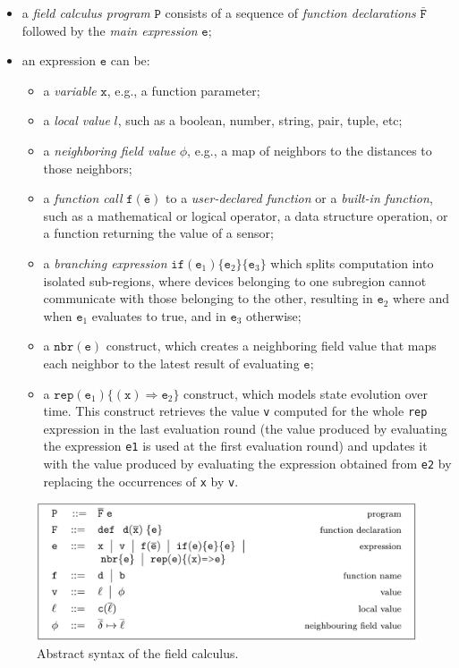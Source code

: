 \begin{itemize}
    \item a \textit{field calculus program} $\texttt{P}$ consists of a sequence of \textit{function declarations} $\bar{\texttt{F}}$ followed by the \textit{main expression} $\texttt{e}$;
    \item an expression $\texttt{e}$ can be:
          \begin{itemize}
              \item a \textit{variable} $\texttt{x}$, e.g., a function parameter;
              \item a \textit{local value} $l$, such as a boolean, number, string, pair, tuple, etc;
              \item a \textit{neighboring field value} $\phi$, e.g., a map of
                    neighbors to the distances to those neighbors;
              \item a \textit{function call} $\texttt{f}(\bar{\texttt{e}})$ to a \textit{user-declared function} or a \textit{built-in function}, such
                    as a mathematical or logical operator, a data structure operation, or a function returning the value of a sensor;
              \item a \textit{branching expression} $\texttt{if} (\texttt{e}_1)\{\texttt{e}_2\}\{\texttt{e}_3\}$ which splits computation into isolated sub-regions, where devices belonging to one subregion cannot communicate with those belonging to the other, resulting in $\texttt{e}_2$ where and when $\texttt{e}_1$ evaluates to true, and in $\texttt{e}_3$ otherwise;
              \item a $\texttt{nbr}(\texttt{e})$ construct, which creates a neighboring field value that maps each neighbor to the latest result of evaluating $\texttt{e}$;
              \item a $\texttt{rep}(\texttt{e}_1)\{(\texttt{x})\Rightarrow \texttt{e}_2\}$ construct, which models state evolution over time. This construct retrieves the value \texttt{v} computed for the whole \texttt{rep} expression in the last evaluation round (the value produced by evaluating the expression \texttt{e1} is used at the first evaluation round) and updates it with the value produced by evaluating the expression obtained from \texttt{e2} by replacing the occurrences of \texttt{x} by \texttt{v}.
          \end{itemize}
\end{itemize}

\begin{figure}
    \centering
    \includegraphics[width=\linewidth]{figures/field-calculus-syntax.jpg}
    \caption{Abstract syntax of the field calculus.}
    \label{fig:field-calculus-syntax}
\end{figure}

